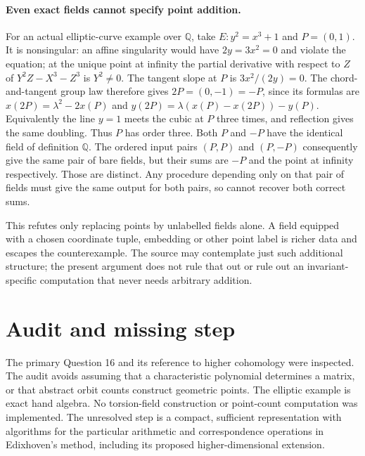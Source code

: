 \documentclass[11pt]{article}
\begin{document}
\paragraph{Even exact fields cannot specify point addition.}
For an actual elliptic-curve example over $\mathbb Q$, take
$E:y^2=x^3+1$ and $P=(0,1)$. It is nonsingular: an affine
singularity would have $2y=3x^2=0$ and violate the equation;
at the unique point at infinity the partial derivative with respect
to $Z$ of $Y^2Z-X^3-Z^3$ is $Y^2\ne0$.
The tangent slope at $P$ is $3x^2/(2y)=0$.
The chord-and-tangent group law therefore gives
$2P=(0,-1)=-P$, since its formulas are
$x(2P)=\lambda^2-2x(P)$ and
$y(2P)=\lambda(x(P)-x(2P))-y(P)$.
Equivalently the line $y=1$ meets the cubic at $P$ three times,
and reflection gives the same doubling. Thus $P$ has order three.
Both $P$ and $-P$ have the identical field of definition $\mathbb Q$.
The ordered input pairs $(P,P)$ and $(P,-P)$ consequently give
the same pair of bare fields, but their sums are $-P$ and the
point at infinity respectively. Those are distinct. Any procedure
depending only on that pair of fields must give the same output
for both pairs, so cannot recover both correct sums.

This refutes only replacing points by unlabelled fields alone.
A field equipped with a chosen coordinate tuple, embedding or other
point label is richer data and escapes the counterexample. The source
may contemplate just such additional structure; the present argument
does not rule that out or rule out an invariant-specific computation
that never needs arbitrary addition.

\section{Audit and missing step}
The primary Question 16 and its reference to higher cohomology were
inspected. The audit avoids assuming that a characteristic polynomial
determines a matrix, or that abstract orbit counts construct geometric
points. The elliptic example is exact hand algebra. No torsion-field
construction or point-count computation was implemented. The unresolved
step is a compact, sufficient representation with algorithms for the
particular arithmetic and correspondence operations in Edixhoven's
method, including its proposed higher-dimensional extension.
\end{document}
